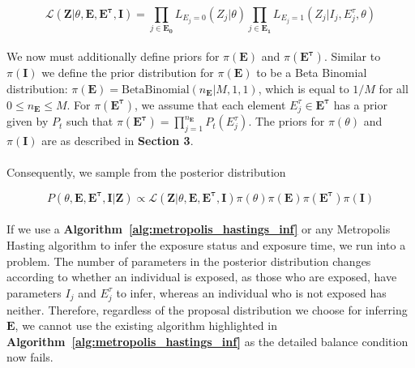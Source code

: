 \begin{equation}
\mathcal{L}(\mathbf{Z} | \theta, \mathbf{E}, \mathbf{E^\tau}, \mathbf{I}) = \prod_{j \in \mathbf{E_0}}L_{E_j = 0}(Z_{j}| \theta) \prod_{j \in \mathbf{E_1}}L_{E_j = 1}(Z_{j}| I_j, E_j^\tau, \theta) 
\end{equation}

\paragraph{}We now must additionally define priors for $\pi(\mathbf{E})$ and $\pi(\mathbf{E^{\tau}})$. Similar to $\pi(\mathbf{I})$ we define the prior distribution for  $\pi(\mathbf{E})$ to be a Beta Binomial distribution: $\pi(\mathbf{E}) = \text{BetaBinomial}(n_{\mathbf{E}}| M, 1, 1)$, which is equal to $1/M$ for all $0 \leq n_{\mathbf{E}} \leq M$. For $\pi(\mathbf{E^{\tau}})$, we assume that each element $E_j^\tau \in \mathbf{E^{\tau}}$ has a prior given by $P_t$ such that $\pi(\mathbf{E^{\tau}}) = \prod_{j = 1}^{n_\mathbf{E}} P_t(E_j^\tau)$. The priors for $\pi(\theta)$ and $\pi(\mathbf{I})$ are as described in \textbf{Section 3}. 

\paragraph{}Consequently, we sample from the posterior distribution

\begin{equation}
P(\theta, \mathbf{E}, \mathbf{E^\tau}, \mathbf{I} | \mathbf{Z}) \propto \mathcal{L}(\mathbf{Z} | \theta, \mathbf{E}, \mathbf{E^\tau}, \mathbf{I})\pi(\theta)\pi(\mathbf{E})\pi( \mathbf{E^\tau})\pi(\mathbf{I})
\end{equation}


\paragraph{}If we use a \textbf{Algorithm~\ref{alg:metropolis_hastings_inf}} or any Metropolis Hasting algorithm to infer the exposure status and exposure time, we run into a problem. The number of parameters in the posterior distribution changes according to whether an individual is exposed, as those who are exposed, have parameters $I_j$ and $E^\tau_j$ to infer, whereas an individual who is not exposed has neither. Therefore, regardless of the proposal distribution we choose for inferring $\mathbf{E}$, we cannot use the existing algorithm highlighted in \textbf{Algorithm~\ref{alg:metropolis_hastings_inf}} as the detailed balance condition now fails. 


